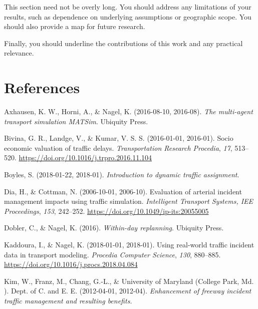 \documentclass[fancy, oneside, mastersfancy, ms]{byuthesis}
\newlength{\cslhangindent}
\newlength{\cslentryspacingunit} %
\newenvironment{CSLReferences}[2] %
 {%
  \setlength{\parindent}{0pt}
  \ifodd #1
  \let\oldpar\par
  \def\par{\hangindent=\cslhangindent\oldpar}
  \fi
  \setlength{\parskip}{#2\cslentryspacingunit}
 }%
 {}
\begin{document}
This section need not be overly long. You should address any limitations
of your results, such as dependence on underlying assumptions or
geographic scope. You should also provide a map for future research.

Finally, you should underline the contributions of this work and any
practical relevance.


\hypertarget{references}{%
\chapter*{References}\label{references}}


\hypertarget{refs}{}
\begin{CSLReferences}{1}{0}
\leavevmode{}%
Axhausen, K. W., Horni, A., \& Nagel, K. (2016-08-10, 2016-08).
\emph{The multi-agent transport simulation {MATSim}}. {Ubiquity Press}.

\leavevmode{}%
Bivina, G. R., Landge, V., \& Kumar, V. S. S. (2016-01-01, 2016-01).
Socio economic valuation of traffic delays. \emph{Transportation
Research Procedia}, \emph{17}, 513--520.
\url{https://doi.org/10.1016/j.trpro.2016.11.104}

\leavevmode{}%
Boyles, S. (2018-01-22, 2018-01). \emph{Introduction to dynamic traffic
assignment}.

\leavevmode{}%
Dia, H., \& Cottman, N. (2006-10-01, 2006-10). Evaluation of arterial
incident management impacts using traffic simulation. \emph{Intelligent
Transport Systems, IEE Proceedings}, \emph{153}, 242--252.
\url{https://doi.org/10.1049/ip-its:20055005}

\leavevmode{}%
Dobler, C., \& Nagel, K. (2016). \emph{Within-day replanning}. {Ubiquity
Press}.

\leavevmode{}%
Kaddoura, I., \& Nagel, K. (2018-01-01, 2018-01). Using real-world
traffic incident data in transport modeling. \emph{Procedia Computer
Science}, \emph{130}, 880--885.
\url{https://doi.org/10.1016/j.procs.2018.04.084}

\leavevmode{}%
Kim, W., Franz, M., Chang, G.-L., \& University of Maryland (College
Park, Md. ). Dept. of C. and E. E. (2012-04-01, 2012-04).
\emph{Enhancement of freeway incident traffic management and resulting
benefits.}


\end{CSLReferences}
\end{document}
